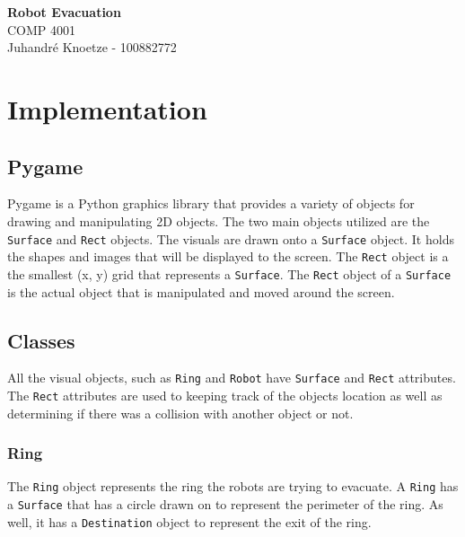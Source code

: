 \documentclass[12pt,letterpaper]{article}
\begin{document}
    \begin{center}
        {\Large\bf Robot Evacuation} \\
        \vspace{0.25em}
        {\large COMP 4001}\\
        \vspace{0.25em}
        Juhandr\'{e} Knoetze - 100882772 \\
    \end{center}

    \section{Implementation}
    \subsection{Pygame}
        Pygame is a Python graphics library that provides a variety of objects for drawing and manipulating 2D objects. The two main objects utilized are the \texttt{Surface} and \texttt{Rect} objects. The visuals are drawn onto a \texttt{Surface} object. It holds the shapes and images that will be displayed to the screen. The \texttt{Rect} object is a the smallest (x, y) grid that represents a \texttt{Surface}. The \texttt{Rect} object of a \texttt{Surface} is the actual object that is manipulated and moved around the screen.
    
    \subsection{Classes}
        All the visual objects, such as \texttt{Ring} and \texttt{Robot} have \texttt{Surface} and \texttt{Rect} attributes. The \texttt{Rect} attributes are used to keeping track of the objects location as well as determining if there was a collision with another object or not.
    
    \subsubsection{Ring}
        The \texttt{Ring} object represents the ring the robots are trying to evacuate. A \texttt{Ring} has a \texttt{Surface} that has a circle drawn on to represent the perimeter of the ring. As well, it has a \texttt{Destination} object to represent the exit of the ring. 
        \newline
    
\end{document}
